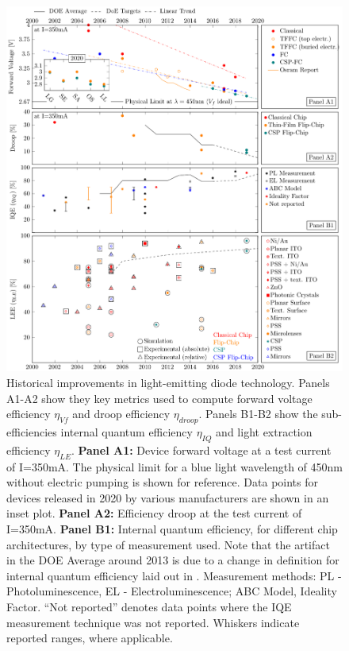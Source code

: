 \documentclass[twoside,twocolumn,9pt]{article}
\begin{document}
\begin{figure}[h!]
 \centering
 \includegraphics[width=17cm]{2_SSL_EES/article/figures/subefficiencies_progress.pdf}
 \caption{Historical improvements in light-emitting diode technology. Panels A1-A2 show they key metrics used to compute forward voltage efficiency $\eta_{Vf}$ and droop efficiency $\eta_{droop}$. Panels B1-B2 show the sub-efficiencies internal quantum efficiency $\eta_{IQ}$ and light extraction efficiency $\eta_{LE}$. \newline
 \textbf{Panel A1:} Device forward voltage at a test current of I=350mA. The physical limit for a blue light wavelength of 450nm without electric pumping is shown for reference. Data points for devices released in 2020 by various manufacturers are shown in an inset plot.
 \textbf{Panel A2:} Efficiency droop at the test current of I=350mA.
 \textbf{Panel B1:} Internal quantum efficiency, for different chip architectures, by type of measurement used. Note that the artifact in the DOE Average around 2013 is due to a change in definition for internal quantum efficiency laid out in \cite{doe_ssl_multiyear_2013}. Measurement methods: PL - Photoluminescence\cite{Shim_2018}, EL - Electroluminescence\cite{Getty_2009};  ABC Model\cite{Karpov_2014}, Ideality Factor\cite{Masui_2010}. “Not reported” denotes data points where the IQE measurement technique was not reported. Whiskers indicate reported ranges, where applicable.
}
\end{figure}
\end{document}
